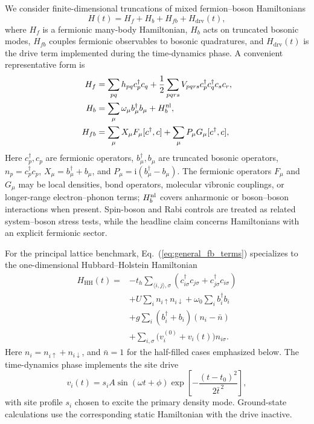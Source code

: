 \documentclass[
  reprint,
  amsmath,
  amssymb,
  aps,
  pra,
  nofootinbib,
  superscriptaddress,
  floatfix
]{revtex4-2}
\newcommand{\ii}{\mathrm{i}}
\newcommand{\drv}{\mathrm{drv}}
\newcommand{\hh}{\mathrm{HH}}
\begin{document}
We consider finite-dimensional truncations of mixed fermion--boson Hamiltonians
\begin{equation}
H(t)=H_f+H_b+H_{fb}+H_{\drv}(t),
\label{eq:general_mixed_hamiltonian}
\end{equation}
where $H_f$ is a fermionic many-body Hamiltonian, $H_b$ acts on truncated bosonic modes, $H_{fb}$ couples fermionic observables to bosonic quadratures, and $H_{\drv}(t)$ is the drive term implemented during the time-dynamics phase. A convenient representative form is
\begin{align}
H_f&=\sum_{pq}h_{pq}c_p^\dagger c_q
+\frac12\sum_{pqrs}V_{pqrs}c_p^\dagger c_q^\dagger c_s c_r,
\nonumber\\
H_b&=\sum_{\mu}\omega_\mu b_\mu^\dagger b_\mu+H_b^{\rm nl},
\nonumber\\
H_{fb}&=\sum_{\mu}X_\mu F_\mu[c^\dagger,c]
+\sum_{\mu}P_\mu G_\mu[c^\dagger,c],
\label{eq:general_fb_terms}
\end{align}
Here $c_p^\dagger,c_p$ are fermionic operators, $b_\mu^\dagger,b_\mu$ are truncated bosonic operators, $n_p=c_p^\dagger c_p$, $X_\mu=b_\mu^\dagger+b_\mu$, and $P_\mu=\ii(b_\mu^\dagger-b_\mu)$. The fermionic operators $F_\mu$ and $G_\mu$ may be local densities, bond operators, molecular vibronic couplings, or longer-range electron--phonon terms; $H_b^{\rm nl}$ covers anharmonic or boson--boson interactions when present. Spin-boson and Rabi controls are treated as related system--boson stress tests, while the headline claim concerns Hamiltonians with an explicit fermionic sector.

For the principal lattice benchmark, Eq.~(\ref{eq:general_fb_terms}) specializes to the one-dimensional Hubbard--Holstein Hamiltonian
\begin{align}
H_{\hh}(t)=&-t_h\sum_{\langle i,j\rangle,\sigma}
\left(c^{\dagger}_{i\sigma}c_{j\sigma}+c^{\dagger}_{j\sigma}c_{i\sigma}\right) \nonumber \\
&+U\sum_i n_{i\uparrow}n_{i\downarrow}
+\omega_0\sum_i b_i^{\dagger}b_i \nonumber \\
&+g\sum_i (b_i^{\dagger}+b_i)(n_i-\bar n) \nonumber \\
&+\sum_{i,\sigma}\bigl(v_i^{(0)}+v_i(t)\bigr)n_{i\sigma} .
\label{eq:hh_second_quantized}
\end{align}
Here $n_i=n_{i\uparrow}+n_{i\downarrow}$, and $\bar n=1$ for the half-filled cases emphasized below. The time-dynamics phase implements the site drive
\begin{equation}
v_i(t)=s_i A\sin(\omega t+\phi)\exp\left[-\frac{(t-t_0)^2}{2\bar t^{\,2}}\right],
\label{eq:drive_waveform}
\end{equation}
with site profile $s_i$ chosen to excite the primary density mode. Ground-state calculations use the corresponding static Hamiltonian with the drive inactive.
\end{document}
